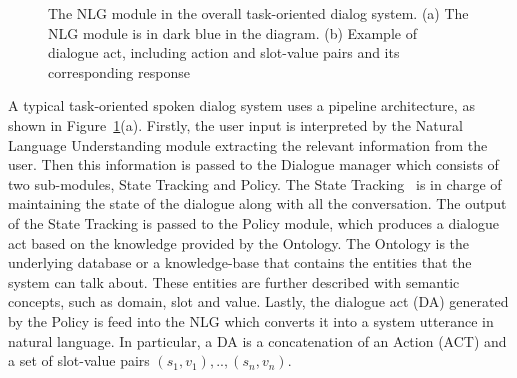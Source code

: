 \documentclass[11pt]{article}
\begin{document}
\begin{figure}%
    \centering
    \qquad
    \caption{The NLG module in the overall task-oriented dialog system. (a) The NLG module is in dark blue in the diagram. (b) Example of dialogue act, including action and slot-value pairs and its corresponding response}%
    \label{fig:dialogue}%
\end{figure}

A typical task-oriented spoken dialog system uses a pipeline architecture, as shown in Figure~\ref{fig:dialogue}(a). Firstly, the user input is interpreted by the Natural Language Understanding module extracting the relevant information from the user. Then this information is passed to the Dialogue manager which consists of two sub-modules, State Tracking and Policy. The State Tracking~\cite{heck2020trippy} is in charge of maintaining the state of the dialogue along with all the conversation. The output of the State Tracking is passed to the Policy module, which produces a dialogue act based on the knowledge provided by the Ontology. The Ontology is the underlying database or a knowledge-base that contains the entities that the system can talk about. These entities are further described with semantic concepts, such as domain, slot and value. Lastly, the dialogue act (DA) generated by the Policy is feed into the NLG which converts it into a system utterance in natural language.
In particular, a DA is a concatenation of an Action (ACT) and a set of slot-value pairs
 $(s_{1},v_{1}), .. , (s_{n},v_{n})$. 
\end{document}
